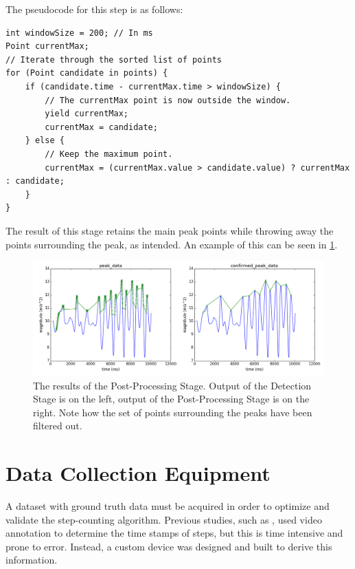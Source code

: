             The pseudocode for this step is as follows:

            \begin{lstlisting}
int windowSize = 200; // In ms
Point currentMax;
// Iterate through the sorted list of points
for (Point candidate in points) {
    if (candidate.time - currentMax.time > windowSize) {
        // The currentMax point is now outside the window. 
        yield currentMax;
        currentMax = candidate;
    } else {
        // Keep the maximum point.
        currentMax = (currentMax.value > candidate.value) ? currentMax : candidate;
    }
}
            \end{lstlisting}

            The result of this stage retains the main peak points while throwing away the points surrounding the peak, as intended. An example of this can be seen in \ref{img_post_stage}.

            \begin{figure}[!th]
                \includegraphics[width=\textwidth]{Images/post_stage.png}
                \centering
                \caption{The results of the Post-Processing Stage. Output of the Detection Stage is on the left, output of the Post-Processing Stage is on the right. Note how the set of points surrounding the peaks have been filtered out.}
                \label{img_post_stage}
            \end{figure}

    \chapter{Data Collection Equipment}
    \label{sc_device}

        A dataset with ground truth data must be acquired in order to optimize and validate the step-counting algorithm. Previous studies, such as \cite{brajdic}, used video annotation to determine the time stamps of steps, but this is time intensive and prone to error. Instead, a custom device was designed and built to derive this information.

